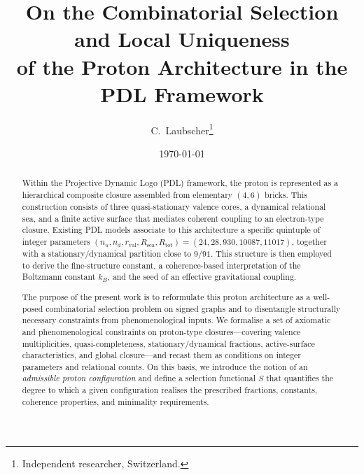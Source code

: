 \documentclass[11pt,a4paper]{article}
\theoremstyle{definition}
\begin{document}
\title{On the Combinatorial Selection and Local Uniqueness\\
of the Proton Architecture in the PDL Framework}

\author{C.~Laubscher\thanks{Independent researcher, Switzerland.}\\[4pt]}

\date{\small \today}

\maketitle

\begin{abstract}
Within the Projective Dynamic Logo (PDL) framework, the proton is represented as a hierarchical composite closure assembled from elementary $(4,6)$ bricks. This construction consists of three quasi-stationary valence cores, a dynamical relational sea, and a finite active surface that mediates coherent coupling to an electron-type closure.\cite{PDL_Main_2026,PDL_Intro_2026,Combinatorial_Proton_v2_2026} Existing PDL models associate to this architecture a specific quintuple of integer parameters $(n_u,n_d,r_{\mathrm{val}},R_{\mathrm{sea}},R_{\mathrm{tot}}) = (24,28,930,10087,11017)$, together with a stationary/dynamical partition close to $9/91$. This structure is then employed to derive the fine-structure constant, a coherence-based interpretation of the Boltzmann constant $k_B$, and the seed of an effective gravitational coupling.\cite{Alpha_PDL_v2_2026,Golden_Ratio_Sketch_2026,Effective_Fields_PDL_2026}

The purpose of the present work is to reformulate this proton architecture as a well-posed combinatorial selection problem on signed graphs and to disentangle structurally necessary constraints from phenomenological inputs. We formalise a set of axiomatic and phenomenological constraints on proton-type closures—covering valence multiplicities, quasi-completeness, stationary/dynamical fractions, active-surface characteristics, and global closure—and recast them as conditions on integer parameters and relational counts.\cite{Combinatorial_Proton_v2_2026,PDL_Global_Mapping_2026} On this basis, we introduce the notion of an \emph{admissible proton configuration} and define a selection functional $S$ that quantifies the degree to which a given configuration realises the prescribed fractions, constants, coherence properties, and minimality requirements.


\end{abstract}
\end{document}
